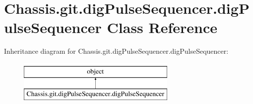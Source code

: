 \hypertarget{class_chassis_8git_1_1dig_pulse_sequencer_1_1dig_pulse_sequencer}{\section{Chassis.\-git.\-dig\-Pulse\-Sequencer.\-dig\-Pulse\-Sequencer Class Reference}
\label{class_chassis_8git_1_1dig_pulse_sequencer_1_1dig_pulse_sequencer}
}
Inheritance diagram for Chassis.\-git.\-dig\-Pulse\-Sequencer.\-dig\-Pulse\-Sequencer\-:\begin{figure}[H]
\begin{center}
\leavevmode
\includegraphics[height=2.000000cm]{class_chassis_8git_1_1dig_pulse_sequencer_1_1dig_pulse_sequencer}
\end{center}
\end{figure}

